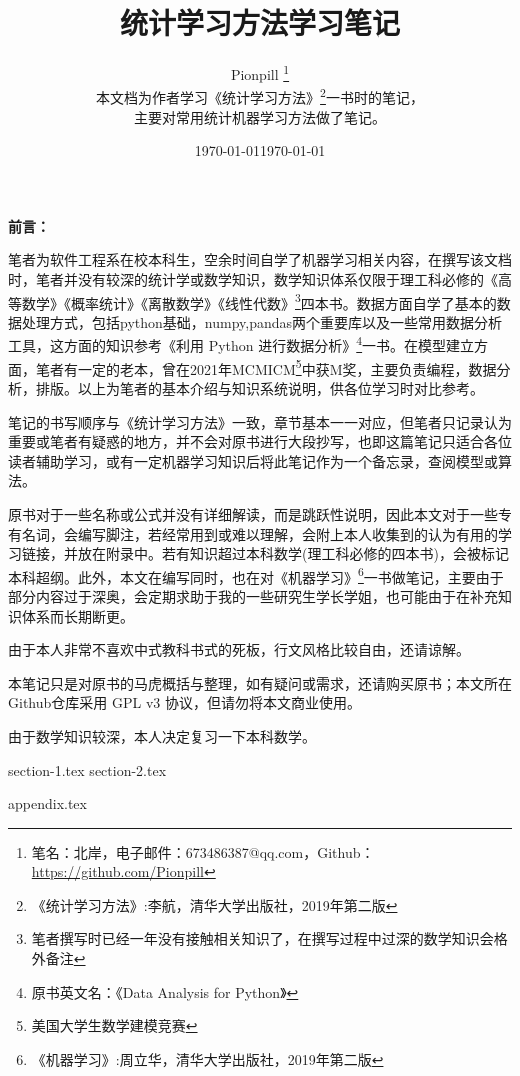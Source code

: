 \documentclass{PionpillNote-book}
\title{统计学习方法学习笔记}
\author{
    Pionpill \footnote{笔名：北岸，电子邮件：673486387@qq.com，Github：\url{https://github.com/Pionpill}} \\
    本文档为作者学习《统计学习方法》\footnote{《统计学习方法》:李航，清华大学出版社，2019年第二版}一书时的笔记，\\
    主要对常用统计机器学习方法做了笔记。\\
}
\date{\today}
\begin{document}
\maketitle

\noindent\textbf{前言：}

笔者为软件工程系在校本科生，空余时间自学了机器学习相关内容，在撰写该文档时，笔者并没有较深的统计学或数学知识，数学知识体系仅限于理工科必修的《高等数学》《概率统计》《离散数学》《线性代数》\footnote{笔者撰写时已经一年没有接触相关知识了，在撰写过程中过深的数学知识会格外备注}四本书。数据方面自学了基本的数据处理方式，包括python基础，numpy,pandas两个重要库以及一些常用数据分析工具，这方面的知识参考《利用 Python 进行数据分析》\footnote{原书英文名：《Data Analysis for Python》}一书。在模型建立方面，笔者有一定的老本，曾在2021年MCMICM\footnote{美国大学生数学建模竞赛}中获M奖，主要负责编程，数据分析，排版。以上为笔者的基本介绍与知识系统说明，供各位学习时对比参考。

笔记的书写顺序与《统计学习方法》一致，章节基本一一对应，但笔者只记录认为重要或笔者有疑惑的地方，并不会对原书进行大段抄写，也即这篇笔记只适合各位读者辅助学习，或有一定机器学习知识后将此笔记作为一个备忘录，查阅模型或算法。

原书对于一些名称或公式并没有详细解读，而是跳跃性说明，因此本文对于一些专有名词，会编写脚注，若经常用到或难以理解，会附上本人收集到的认为有用的学习链接，并放在附录中。若有知识超过本科数学(理工科必修的四本书)，会被标记本科超纲。此外，本文在编写同时，也在对《机器学习》\footnote{《机器学习》:周立华，清华大学出版社，2019年第二版}一书做笔记，主要由于部分内容过于深奥，会定期求助于我的一些研究生学长学姐，也可能由于在补充知识体系而长期断更。

由于本人非常不喜欢中式教科书式的死板，行文风格比较自由，还请谅解。

本笔记只是对原书的马虎概括与整理，如有疑问或需求，还请购买原书；本文所在Github仓库采用 GPL v3 协议，但请勿将本文商业使用。

由于数学知识较深，本人决定复习一下本科数学。

\date{\today}

\tableofcontents
\thispagestyle{empty}
\newpage
\setcounter{page}{1}

{section-1.tex}
{section-2.tex}

{appendix.tex}
\end{document}
